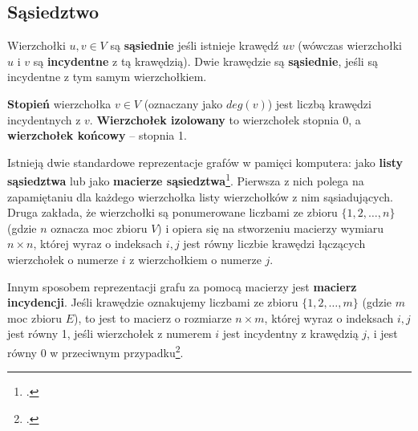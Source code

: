 \subsection*{Sąsiedztwo}

Wierzchołki $u,v \in V$ są \textbf{sąsiednie} jeśli istnieje krawędź $uv$ (wówczas wierzchołki $u$ i $v$ są \textbf{incydentne} z tą krawędzią). Dwie krawędzie są \textbf{sąsiednie}, jeśli są incydentne z tym samym wierzchołkiem. 

\textbf{Stopień} wierzchołka $v \in V$ (oznaczany jako $deg(v)$) jest liczbą krawędzi incydentnych z $v$. \textbf{Wierzchołek izolowany} to wierzchołek stopnia 0, a \textbf{wierzchołek końcowy} -- stopnia 1.

Istnieją dwie standardowe reprezentacje grafów w pamięci komputera: jako \textbf{listy sąsiedztwa} lub jako \textbf{macierze sąsiedztwa}\footcites[29]{banachowski}[600]{cormen}. Pierwsza z nich polega na zapamiętaniu dla każdego wierzchołka listy wierzchołków z nim sąsiadujących. Druga zakłada, że wierzchołki są ponumerowane liczbami ze zbioru $\{1, 2,\ldots,n\}$ (gdzie $n$ oznacza moc zbioru $V$) i opiera się na stworzeniu macierzy wymiaru $n \times n$, której wyraz o indeksach $i,j$ jest równy liczbie krawędzi łączących wierzchołek o numerze $i$ z wierzchołkiem o numerze $j$.

Innym sposobem reprezentacji grafu za pomocą macierzy jest \textbf{macierz incydencji}. Jeśli krawędzie oznakujemy liczbami ze zbioru $\{1,2,\ldots,m\}$ (gdzie $m$ moc zbioru $E$), to jest to macierz o rozmiarze $n \times m$, której wyraz o indeksach $i,j$ jest równy 1, jeśli wierzchołek z numerem $i$ jest incydentny z krawędzią $j$, i jest równy 0 w przeciwnym przypadku\footcite[27]{ross}.

\begin{figure}[H]
\centering
\caption{}\label{fig:graph-edge-labeled}
\end{figure}

